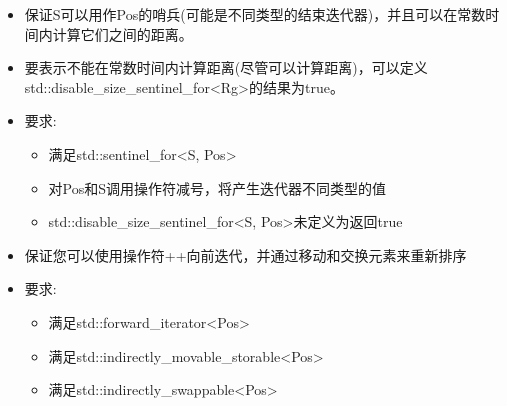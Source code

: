 
\begin{itemize}
\item
保证S可以用作Pos的哨兵(可能是不同类型的结束迭代器)，并且可以在常数时间内计算它们之间的距离。

\item
要表示不能在常数时间内计算距离(尽管可以计算距离)，可以定义std::disable\_size\_sentinel\_for<Rg>的结果为true。

\item
要求:
\begin{itemize}
\item
满足std::sentinel\_for<S, Pos> 

\item
对Pos和S调用操作符减号，将产生迭代器不同类型的值

\item
std::disable\_size\_sentinel\_for<S, Pos>未定义为返回true
\end{itemize}
\end{itemize}



\begin{itemize}
\item
保证您可以使用操作符++向前迭代，并通过移动和交换元素来重新排序

\item
要求:
\begin{itemize}
\item
满足std::forward\_iterator<Pos> 

\item
满足std::indirectly\_movable\_storable<Pos>

\item
满足std::indirectly\_swappable<Pos>
\end{itemize}
\end{itemize}


